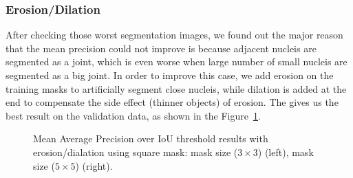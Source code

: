 \documentclass[runningheads]{llncs}
\begin{document}
\subsubsection{Erosion/Dilation}
After checking those worst segmentation images, we found out the major reason that the mean precision could not improve is because adjacent nucleis are segmented as a joint, which is even worse when large number of small nucleis are segmented as a big joint. In order to improve this case, we add erosion on the training masks to artificially segment close nucleis, while dilation is added at the end to compensate the side effect (thinner objects) of erosion. The gives us the best result on the validation data, as shown in the Figure~\ref{fig:erosion}.

\begin{figure}[ht]
	\centering
	\setlength{\fboxrule}{0.0pt}
	\caption{Mean Average Precision over IoU threshold results with erosion/dialation using square mask: mask size ($3\times 3$) (left), mask size ($5\times 5$)  (right).}
	\label{fig:erosion}
\end{figure}
\end{document}
